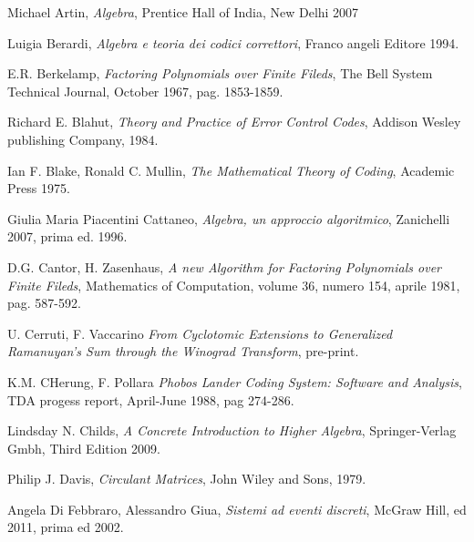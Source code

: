 \newpage

\begin{thebibliography}{25}

Michael Artin, \emph{Algebra}, Prentice Hall of India, New Delhi 2007 

Luigia Berardi, \emph{Algebra e teoria dei codici correttori}, Franco angeli
Editore 1994.

E.R. Berkelamp, \emph{Factoring Polynomials over Finite Fileds}, 
The Bell System Technical Journal, October 1967, pag. 1853-1859.

Richard E. Blahut, \emph{Theory and Practice of Error Control Codes}, 
Addison Wesley publishing Company, 1984.

Ian F. Blake, Ronald C. Mullin, \emph{The Mathematical Theory of Coding},
Academic Press 1975.



Giulia Maria Piacentini Cattaneo, \emph{Algebra, un approccio algoritmico},
Zanichelli 2007, prima ed. 1996.

D.G. Cantor, H. Zasenhaus, \emph{A new Algorithm for Factoring Polynomials over Finite Fileds},
Mathematics of Computation, volume 36, numero 154, aprile 1981, pag. 587-592. 

 
 U. Cerruti, F. Vaccarino \emph{From Cyclotomic Extensions to Generalized
 Ramanuyan's Sum through the Winograd Transform}, pre-print.

K.M. CHerung, F. Pollara \emph{Phobos Lander Coding System: Software and Analysis},
TDA progess report, April-June 1988, pag 274-286.
 
 
 
Lindsday N. Childs, \emph{A Concrete Introduction to Higher Algebra},
Springer-Verlag Gmbh, Third Edition 2009.

Philip J. Davis, \emph{Circulant Matrices},
John Wiley and Sons, 1979.

Angela Di Febbraro, Alessandro Giua, \emph{Sistemi ad eventi discreti},
McGraw Hill, ed 2011, prima ed 2002.


\end{thebibliography}
